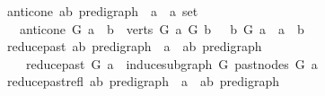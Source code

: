\begin{isabellebody}
\isamarkupfalse%
\ anticone{\isacharcolon}{\kern0pt}{\isacharcolon}{\kern0pt}\ {\isachardoublequoteopen}{\isacharparenleft}{\kern0pt}{\isacharprime}{\kern0pt}a{\isacharcomma}{\kern0pt}{\isacharprime}{\kern0pt}b{\isacharparenright}{\kern0pt}\ pre{\isacharunderscore}{\kern0pt}digraph\ {\isasymRightarrow}\ {\isacharprime}{\kern0pt}a\ {\isasymRightarrow}\ {\isacharprime}{\kern0pt}a\ set{\isachardoublequoteclose}\isanewline
\ \ \ {\isachardoublequoteopen}anticone\ G\ a\ {\isacharequal}{\kern0pt}\ {\isacharbraceleft}{\kern0pt}b\ {\isasymin}\ verts\ G{\isachardot}{\kern0pt}\ {\isasymnot}{\isacharparenleft}{\kern0pt}a\ {\isasymrightarrow}\isactrlsup {\isacharplus}{\kern0pt}\isactrlbsub G\isactrlesub \ b\ {\isasymor}\ \ b\ {\isasymrightarrow}\isactrlsup {\isacharplus}{\kern0pt}\isactrlbsub G\isactrlesub \ a\ {\isasymor}\ a\ {\isacharequal}{\kern0pt}\ b{\isacharparenright}{\kern0pt}{\isacharbraceright}{\kern0pt}{\isachardoublequoteclose}\ \isanewline
\isanewline
{}\isamarkupfalse%
\ reduce{\isacharunderscore}{\kern0pt}past{\isacharcolon}{\kern0pt}{\isacharcolon}{\kern0pt}\ {\isachardoublequoteopen}{\isacharparenleft}{\kern0pt}{\isacharprime}{\kern0pt}a{\isacharcomma}{\kern0pt}{\isacharprime}{\kern0pt}b{\isacharparenright}{\kern0pt}\ pre{\isacharunderscore}{\kern0pt}digraph\ {\isasymRightarrow}\ {\isacharprime}{\kern0pt}a\ {\isasymRightarrow}\ {\isacharparenleft}{\kern0pt}{\isacharprime}{\kern0pt}a{\isacharcomma}{\kern0pt}{\isacharprime}{\kern0pt}b{\isacharparenright}{\kern0pt}\ pre{\isacharunderscore}{\kern0pt}digraph{\isachardoublequoteclose}\isanewline
\ \ \ \isanewline
\ \ \ \ {\isachardoublequoteopen}reduce{\isacharunderscore}{\kern0pt}past\ G\ a\ {\isacharequal}{\kern0pt}\ induce{\isacharunderscore}{\kern0pt}subgraph\ G\ {\isacharparenleft}{\kern0pt}past{\isacharunderscore}{\kern0pt}nodes\ G\ a{\isacharparenright}{\kern0pt}{\isachardoublequoteclose}\isanewline
\isanewline
{}\isamarkupfalse%
\ reduce{\isacharunderscore}{\kern0pt}past{\isacharunderscore}{\kern0pt}refl{\isacharcolon}{\kern0pt}{\isacharcolon}{\kern0pt}\ {\isachardoublequoteopen}{\isacharparenleft}{\kern0pt}{\isacharprime}{\kern0pt}a{\isacharcomma}{\kern0pt}{\isacharprime}{\kern0pt}b{\isacharparenright}{\kern0pt}\ pre{\isacharunderscore}{\kern0pt}digraph\ {\isasymRightarrow}\ {\isacharprime}{\kern0pt}a\ {\isasymRightarrow}\ {\isacharparenleft}{\kern0pt}{\isacharprime}{\kern0pt}a{\isacharcomma}{\kern0pt}{\isacharprime}{\kern0pt}b{\isacharparenright}{\kern0pt}\ pre{\isacharunderscore}{\kern0pt}digraph{\isachardoublequoteclose}\isanewline

\end{isabellebody}
